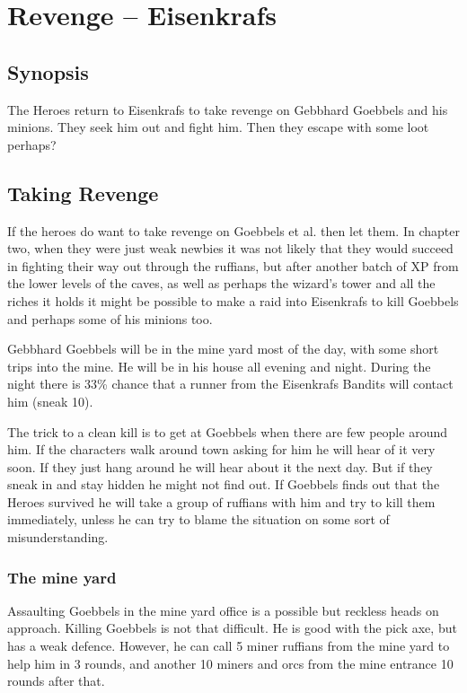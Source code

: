 \documentclass[11pt, twoside, titlepage, a4paper]{report}
\renewcommand{\chaptermark}[1]{\markboth{#1}{}}
\begin{document}

\clearpage
{}
\section*{Revenge -- Eisenkrafs}
\chaptermark{revenge in eisenkrafs}


\subsection*{Synopsis}
The Heroes return to Eisenkrafs to take revenge on Gebbhard Goebbels and his minions. They seek him out and fight him. Then they escape with some loot perhaps?


\subsection*{Taking Revenge}
If the heroes do want to take revenge on Goebbels et al. then let them. In chapter two, when they were just weak newbies it was not likely that they would succeed in fighting their way out through the ruffians, but after another batch of XP from the lower levels of the caves, as well as perhaps the wizard's tower and all the riches it holds it might be possible to make a raid into Eisenkrafs to kill Goebbels and perhaps some of his minions too.

Gebbhard Goebbels will be in the mine yard most of the day, with some short trips into the mine. He will be in his house all evening and night. During the night there is 33\% chance that a runner from the Eisenkrafs Bandits will contact him (sneak 10).

The trick to a clean kill is to get at Goebbels when there are few people around him. If the characters walk around town asking for him he will hear of it very soon. If they just hang around he will hear about it the next day. But if they sneak in and stay hidden he might not find out. If Goebbels finds out that the Heroes survived he will take a group of ruffians with him and try to kill them immediately, unless he can try to blame the situation on some sort of misunderstanding.


\subsubsection*{The mine yard}
Assaulting Goebbels in the mine yard office is a possible but reckless heads on approach. Killing Goebbels is not that difficult. He is good with the pick axe, but has a weak defence. However, he can call 5 miner ruffians from the mine yard to help him in 3 rounds, and another 10 miners and orcs from the mine entrance 10 rounds after that.
\end{document}
